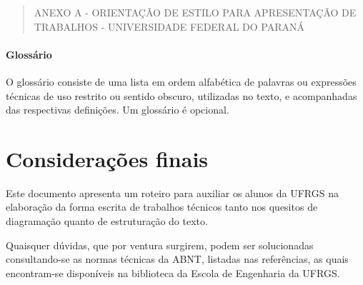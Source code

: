 \documentclass[repeatfields,xlists,xpacks,oneside,yearsonly]{ufrgscca}
\begin{document}
    \begin{quote}ANEXO A - ORIENTAÇÃO DE ESTILO PARA APRESENTAÇÃO DE TRABALHOS - UNIVERSIDADE FEDERAL DO PARANÁ\\\end{quote}

    \subsubsection{Glossário}

    O glossário consiste de uma lista em ordem alfabética de palavras ou
    expressões técnicas de uso restrito ou sentido obscuro, utilizadas no texto,
    e acompanhadas das respectivas definições. Um glossário é opcional.


    \chapter{Considerações finais}
    \label{conclusao}

    Este documento apresenta um roteiro para auxiliar os
    alunos da UFRGS na elaboração da forma escrita de trabalhos técnicos
    tanto nos quesitos de diagramação quanto de
    estruturação do texto.

    Quaisquer dúvidas, que por ventura surgirem, podem ser solucionadas
    consultando-se as normas técnicas da ABNT, listadas nas referências, as
    quais encontram-se disponíveis na biblioteca da Escola de Engenharia da
    UFRGS.

    \printbibliography
\end{document}

